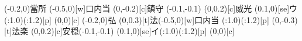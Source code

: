 \documentclass[m_shidai]{subfiles}
\begin{document}
\newline
\karifu(-0.2,0){當所}
{\chikara{\lw}\tsuya{\q}
\aki\qyu\moji(-0.5,0)[w]{口内当}}
\karifu(0,-0.2)[c]{鎮守}
{\qyu\moveTo(-0.1,-0.1)\iro{\c}\sho{}
\iro{\c}\sho\tsuya{\q}}
\karifu(0,0.2)[c]{威光}
  {\tsuya{\q}\ooyu{\q}\kili[e]\moji(0.1,0)[se]{ウ}
   \base(\s:1.0)\modori*(\w:1.2)[p]\orisute
   \iro{\k}\sho\iro[2]{\k}\sho}
\karifu(0,0)[c]{\hspace{-0.3zw}}{\chikara{\s}\tsuya{\q}\aki\tsuya{\q}}\newline
\karifu(-0.2,0){弘}{\chikara{\lw}\tsuya{\q}}
\karifu(0,0.3)[t]{法}{\qyu\moji(-0.5,0)[w]{口内当}}
{\tsuya{\q}%
\ooyu{\q}\kili[se]\base(\s:1.0)\modori*(\w:1.2)[p]\orisute\iro{\k}\sho\iro[2]{\k}\sho}%
\karifu(0,-0.3)[t]{法楽}
{\uchitsuke{\q}\tsuya{\q}
\aki\tsuya{\q}}
\newline
{\lwoo\aki{\q}\tsuya{\q}\sho}
\karifu(0,0.2)[c]{安穏}{\qyu\moveTo(-0.1,-0.1)\iro{\c}\sho{}%
\iro{\c}\sho\tsuya{\q}}
{\lwoo\tsu\aki{\q}
\ooyu{\q}\kili[e]\moji(0.1,0)[se]{イ}\base(\s:1.0)\modori*(\w:1.2)[p]\orisute\iro{\k}\sho\iro[2]{\k}\sho}
\karifu(0,0)[c]
{\hspace{-0.2zw}}
{\sho\tsuya{\q}\aki\tsuya{\q}}
\newline
\end{document}
